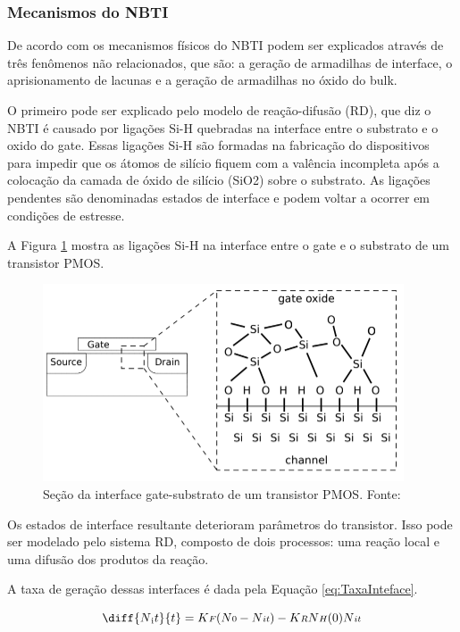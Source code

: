\subsubsection{Mecanismos do NBTI}

De acordo com \cite{Zeng} os mecanismos físicos do NBTI podem ser explicados através de três fenômenos não relacionados, que são: a geração de armadilhas de interface, o aprisionamento de lacunas e a geração de armadilhas no óxido do bulk.

O primeiro pode ser explicado pelo modelo de reação-difusão (RD), que diz o NBTI é causado por ligações Si-H quebradas na interface entre o substrato e o oxido do gate. Essas ligações Si-H são formadas na fabricação do dispositivos para impedir que os átomos de silício fiquem com a valência incompleta após a colocação da camada de óxido de silício (SiO\small{2}) sobre o substrato. As ligações pendentes são denominadas estados de interface e podem voltar a ocorrer em condições de estresse.

A Figura \ref{fig:PmosCrossSec} mostra as ligações Si-H na interface entre o gate e o substrato de um transistor PMOS.

\begin{figure}[H]
    \centering
    \includegraphics[scale=1]{figures/Cross section of a PMOS transistor.png}
    \caption{Seção da interface gate-substrato de um transistor PMOS. Fonte: \cite{Lorenz}}
    \label{fig:PmosCrossSec}
\end{figure}

Os estados de interface resultante deterioram parâmetros do transistor. Isso pode ser modelado pelo sistema RD, composto de dois processos: uma reação local e uma difusão dos produtos da reação.

A taxa de geração dessas interfaces é dada pela Equação \ref{eq:TaxaInteface}.

\begin{equation}
    \label{eq:TaxaInteface}
    \diff{N{\textsubscript it}}{t} = K{\scriptstyle F}(N{\scriptstyle 0} - N{\scriptstyle it}) - K{\scriptstyle R}N{\scriptstyle H}(0)N{\scriptstyle it}
\end{equation}

